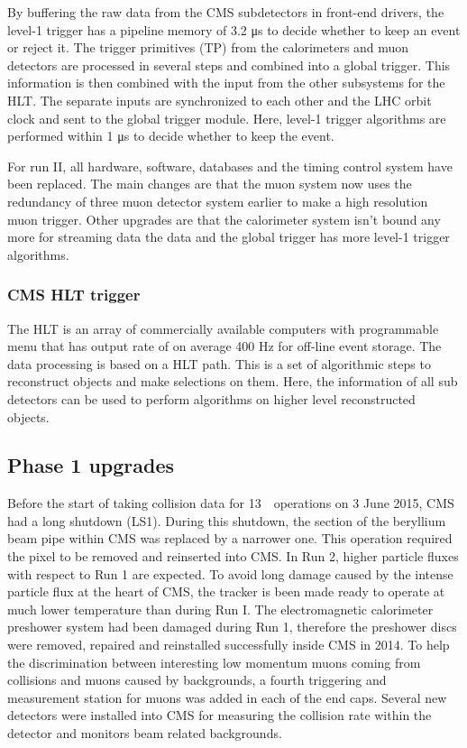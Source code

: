 By buffering the raw data from the CMS subdetectors in front-end drivers, the level-1 trigger has a pipeline memory of 3.2 \si{ \micro \second} to decide whether to keep an event or reject it. 
The trigger primitives (TP) from the calorimeters and muon detectors are processed in several steps and combined into a global trigger. This information is then combined with the input from the other subsystems for the HLT. The separate inputs are synchronized to each other and the LHC orbit clock and sent to the global trigger module. Here, level-1 trigger algorithms are performed within 1 \si{ \micro \second} to decide whether to  keep the event. 

For run II, all hardware, software, databases and the timing control system have been replaced. The main changes are that the muon system now uses the redundancy of three muon detector system earlier to make a high resolution muon trigger. Other upgrades are that the calorimeter system isn't bound any more for streaming data the data and the global trigger has more level-1 trigger algorithms. 

\subsubsection*{CMS HLT trigger}
The HLT is an array of commercially available computers with programmable menu that has output rate of on average 400 \si{ \hertz} for off-line event storage.
The data processing is based on a HLT path. This is a  set of algorithmic steps to reconstruct objects and make selections on them.  Here, the information of all sub detectors can be used to perform algorithms on higher level reconstructed objects. 

\subsection{Phase 1 upgrades}
\label{sec:Phase1}
Before the start of taking collision data for 13~\TeV\ operations on 3 June 2015, CMS had a long shutdown (LS1)\cite{Pralavorio:2024977}. During this shutdown, the section of the beryllium beam pipe within CMS was replaced by a narrower one. This operation required the pixel to be  removed and reinserted into CMS. In Run 2, higher particle fluxes with respect to Run 1 are expected. To avoid long damage caused by the intense particle flux at the heart of CMS, the tracker is been made ready to operate at much lower temperature than during Run I.  The electromagnetic calorimeter preshower system had been damaged during Run 1, therefore the preshower discs were removed, repaired and reinstalled successfully inside CMS in 2014. To help the discrimination between interesting low momentum muons coming from collisions and muons caused by backgrounds, a fourth triggering and measurement station for muons was added in each of the end caps. Several new detectors were installed into CMS for measuring the collision rate within the detector and monitors beam related backgrounds. 

